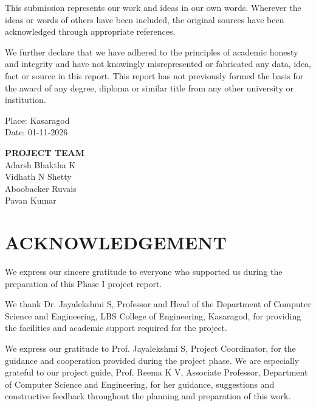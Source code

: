 \documentclass[12pt,a4paper,oneside]{report}
\begin{document}
This submission represents our work and ideas in our own words. Wherever the ideas or words of others have been included, the original sources have been acknowledged through appropriate references.

We further declare that we have adhered to the principles of academic honesty and integrity and have not knowingly misrepresented or fabricated any data, idea, fact or source in this report. This report has not previously formed the basis for the award of any degree, diploma or similar title from any other university or institution.

\vspace{1.0cm}
\noindent
\begin{minipage}[t]{0.5\textwidth}
Place: Kasaragod\\
Date: 01-11-2026
\end{minipage}%
\begin{minipage}[t]{0.5\textwidth}
\raggedleft
\textbf{PROJECT TEAM}\\
Adarsh Bhaktha K\\
Vidhath N Shetty\\
Aboobacker Ruvais\\
Pavan Kumar
\end{minipage}
\clearpage

\chapter*{ACKNOWLEDGEMENT}
\thispagestyle{plain}
We express our sincere gratitude to everyone who supported us during the preparation of this Phase I project report.

We thank Dr. Jayalekshmi S, Professor and Head of the Department of Computer Science and Engineering, LBS College of Engineering, Kasaragod, for providing the facilities and academic support required for the project.

We express our gratitude to Prof. Jayalekshmi S, Project Coordinator, for the guidance and cooperation provided during the project phase. We are especially grateful to our project guide, Prof. Reema K V, Associate Professor, Department of Computer Science and Engineering, for her guidance, suggestions and constructive feedback throughout the planning and preparation of this work.
\end{document}
